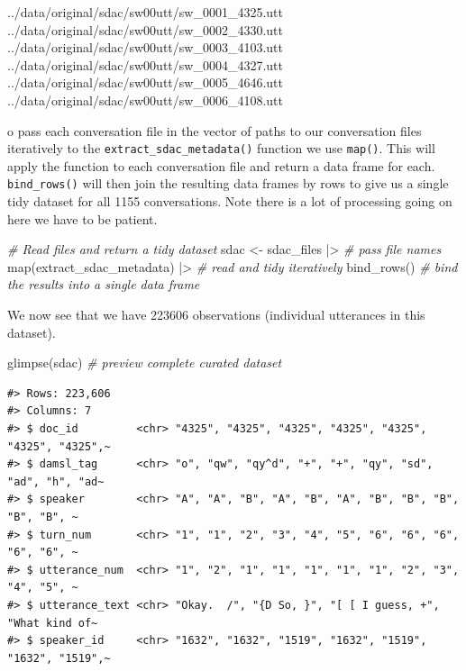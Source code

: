 \documentclass[
  letterpaper,
]{latex/krantz}
\newenvironment{Shaded}{\begin{snugshade}}{\end{snugshade}}
\newcommand{\CommentTok}[1]{\textcolor[rgb]{0.00,0.00,0.00}{\textit{#1}}}
\newcommand{\FunctionTok}[1]{\textcolor[rgb]{0.00,0.00,0.00}{#1}}
\newcommand{\NormalTok}[1]{\textcolor[rgb]{0.00,0.00,0.00}{#1}}
\newcommand{\OtherTok}[1]{\textcolor[rgb]{0.00,0.00,0.00}{#1}}
\newcommand{\SpecialCharTok}[1]{\textcolor[rgb]{0.00,0.00,0.00}{#1}}
\begin{document}
\begin{Shaded}
\begin{Highlighting}[]
\NormalTok{../data/original/sdac/sw00utt/sw\_0001\_4325.utt}
\NormalTok{../data/original/sdac/sw00utt/sw\_0002\_4330.utt}
\NormalTok{../data/original/sdac/sw00utt/sw\_0003\_4103.utt}
\NormalTok{../data/original/sdac/sw00utt/sw\_0004\_4327.utt}
\NormalTok{../data/original/sdac/sw00utt/sw\_0005\_4646.utt}
\NormalTok{../data/original/sdac/sw00utt/sw\_0006\_4108.utt}
\end{Highlighting}
\end{Shaded}

o pass each conversation file in the vector of paths to our conversation
files iteratively to the \texttt{extract\_sdac\_metadata()} function we
use \texttt{map()}. This will apply the function to each conversation
file and return a data frame for each. \texttt{bind\_rows()} will then
join the resulting data frames by rows to give us a single tidy dataset
for all 1155 conversations. Note there is a lot of processing going on
here we have to be patient.

\begin{Shaded}
\begin{Highlighting}[]
\CommentTok{\# Read files and return a tidy dataset}
\NormalTok{sdac }\OtherTok{\textless{}{-}} 
\NormalTok{  sdac\_files }\SpecialCharTok{|\textgreater{}} \CommentTok{\# pass file names}
  \FunctionTok{map}\NormalTok{(extract\_sdac\_metadata) }\SpecialCharTok{|\textgreater{}} \CommentTok{\# read and tidy iteratively }
  \FunctionTok{bind\_rows}\NormalTok{() }\CommentTok{\# bind the results into a single data frame}
\end{Highlighting}
\end{Shaded}

We now see that we have 223606 observations (individual utterances in
this dataset).

\begin{Shaded}
\begin{Highlighting}[]
\FunctionTok{glimpse}\NormalTok{(sdac) }\CommentTok{\# preview complete curated dataset}
\end{Highlighting}
\end{Shaded}

\begin{verbatim}
#> Rows: 223,606
#> Columns: 7
#> $ doc_id         <chr> "4325", "4325", "4325", "4325", "4325", "4325", "4325",~
#> $ damsl_tag      <chr> "o", "qw", "qy^d", "+", "+", "qy", "sd", "ad", "h", "ad~
#> $ speaker        <chr> "A", "A", "B", "A", "B", "A", "B", "B", "B", "B", "B", ~
#> $ turn_num       <chr> "1", "1", "2", "3", "4", "5", "6", "6", "6", "6", "6", ~
#> $ utterance_num  <chr> "1", "2", "1", "1", "1", "1", "1", "2", "3", "4", "5", ~
#> $ utterance_text <chr> "Okay.  /", "{D So, }", "[ [ I guess, +", "What kind of~
#> $ speaker_id     <chr> "1632", "1632", "1519", "1632", "1519", "1632", "1519",~
\end{verbatim}
\end{document}
